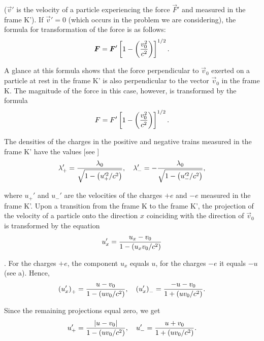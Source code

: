 \noindent
($\vec{v}'$ is the velocity of a particle experiencing the force $\vec{F}'$ and measured in the frame K'). If $\vec{v}'=0$ (which occurs in the problem we are considering), the formula for transformation of the force is as follows:
\begin{equation*}
    \boldsymbol{F} = \boldsymbol{F}' \left[1 - \left( \frac{v_0^2}{c^2} \right)\right]^{1/2}.
\end{equation*}

A glance at this formula shows that the force perpendicular to $\vec{v}_0$ exerted on a particle at rest in the frame K' is also perpendicular to the vector $\vec{v}_0$ in the frame K. The magnitude of the force in this case, however, is transformed by the formula
\begin{equation}\label{eq:6_52}
    F = F' \left[1 - \left( \frac{v_0^2}{c^2} \right)\right]^{1/2}.
\end{equation}

The densities of the charges in the positive and negative trains measured in the frame K' have the values [see ]
\begin{equation}\label{eq:6_53}
    \lambda_+' = \frac{\lambda_0}{\sqrt{1 - \left(u_+'^2/c^2\right)}},\quad \lambda_-' = - \frac{\lambda_0}{\sqrt{1 - \left(u_-'^2/c^2\right)}},
\end{equation}

\noindent
where $u_+'$ and $u_-'$ are the velocities of the charges $+e$ and $-e$ measured in the frame K'. Upon a transition from the frame K to the frame K', the projection of the velocity of a particle onto the direction $x$ coinciding with the direction of $\vec{v}_0$ is transformed by the equation
\begin{equation*}
    u_x' = \frac{u_x - v_0}{1 - \left(u_xv_0/c^2\right)}
\end{equation*}

. For the charges $+e$, the component $u_x$ equals $u$, for the charges $-e$ it equals $-u$ (see a). Hence,
\begin{equation*}
    \left(u_x'\right)_+ = \frac{u - v_0}{1 - \left(uv_0/c^2\right)},\quad \left(u_x'\right)_- = \frac{-u - v_0}{1 + \left(uv_0/c^2\right)}.
\end{equation*}

\noindent
Since the remaining projections equal zero, we get
\begin{equation}\label{eq:6_54}
    u_+' = \frac{|u - v_0|}{1 - \left(uv_0/c^2\right)},\quad u_-' = \frac{u + v_0}{1 + \left(uv_0/c^2\right)}.
\end{equation}

